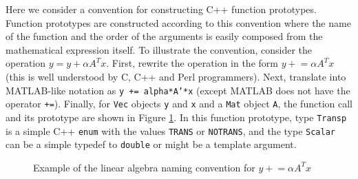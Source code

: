 \documentclass[acmtoms,acmnow]{acmtrans2m}
\begin{document}
Here we consider a convention for constructing C++ function prototypes.
Function prototypes are constructed according to this convention where the
name of the function and the order of the arguments is easily composed from
the mathematical expression itself.  To illustrate the convention, consider
the operation $y = y + \alpha A^T x$.  First, rewrite the operation in the
form $y +\!= \alpha A^T x$ (this is well understood by C, C++ and Perl
programmers).  Next, translate into MATLAB-like notation as {}\texttt{y +=
alpha*A'*x} (except MATLAB does not have the operator {}\texttt{+=}).
Finally, for {}\texttt{Vec} objects {}\texttt{y} and {}\texttt{x} and a
{}\texttt{Mat} object {}\texttt{A}, the function call and its prototype are
shown in Figure {}\ref{rsqppp:fig:example_linalgpack_convention}.  In this
function prototype, type {}\texttt{Transp} is a simple C++ {}\texttt{enum}
with the values {}\texttt{TRANS} or {}\texttt{NOTRANS}, and the type
{}\texttt{Scalar} can be a simple typedef to {}\texttt{double} or might be a
template argument.

{\bsinglespace
\begin{figure}
\caption[Example of naming convention for functions for linear algebra function]{
\label{rsqppp:fig:example_linalgpack_convention}
Example of the linear algebra naming convention for $y +\!\!= \alpha A^T x$
}
\end{figure}
\esinglespace}
\end{document}
